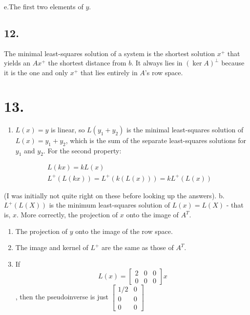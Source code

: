 \documentclass[]{article}
\providecommand{\tightlist}{%
  \setlength{\itemsep}{0pt}\setlength{\parskip}{0pt}}
\begin{document}
e.The first two elements of \(y\).

\hypertarget{section-10}{%
\subsection{12.}\label{section-10}}

The minimal least-squares solution of a system is the shortest solution
\(x^+\) that yields an \(Ax^+\) the shortest distance from \(b\). It
always lies in \((\ker A)^{\perp}\) because it is the one and only
\(x^+\) that lies entirely in \(A\)'s row space.

\hypertarget{section-11}{%
\section{13.}\label{section-11}}

\begin{enumerate}
\def\labelenumi{\alph{enumi}.}
\tightlist
\item
  \(L(x) = y\) is linear, so \(L(y_1 + y_2)\) is the minimal
  least-squares solution of \(L(x) = y_1 +y_2\), which is the sum of the
  separate least-squares solutions for \(y_1\) and \(y_2\). For the
  second property:
\end{enumerate}

\[
  \begin{aligned}
    & L(kx) = kL(x)\\
    & L^+(L(kx)) = L^+(k(L(x))) = kL^+(L(x))
  \end{aligned}
\]

(I was initially not quite right on these before looking up the
answers). b. \(L^+(L(X))\) is the minimum least-squares solution of
\(L(x) = L(X)\) - that is, \(x\). More correctly, the projection of
\(x\) onto the image of \(A^T\).

\begin{enumerate}
\def\labelenumi{\alph{enumi}.}
\setcounter{enumi}{2}
\item
  The projection of \(y\) onto the image of the row space.
\item
  The image and kernel of \(L^+\) are the same as those of \(A^T\).
\item
  If \[ L(x) = \begin{bmatrix}
  2 & 0 & 0\\
  0 & 0 & 0
  \end{bmatrix}x\], then the pseudoinverse is just
  \(\begin{bmatrix}1/2 & 0\\0&0\\0&0\end{bmatrix}\)
\end{enumerate}
\end{document}
